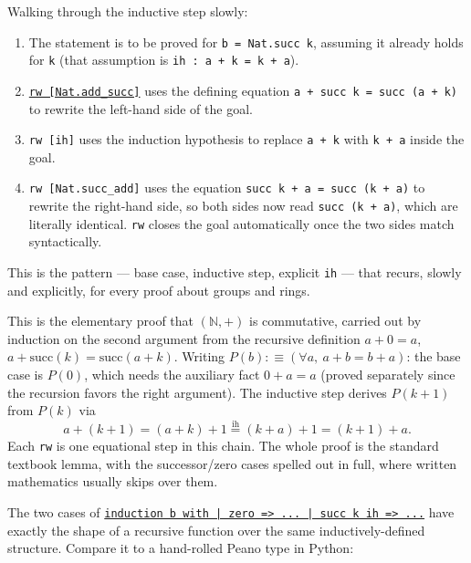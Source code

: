 Walking through the inductive step slowly:

\begin{enumerate}
\def\labelenumi{\arabic{enumi}.}
\tightlist
\item
  The statement is to be proved for \texttt{b = Nat.succ k}, assuming it already holds for \texttt{k} (that assumption is \texttt{ih : a + k = k + a}).
\item
  \href{https://lean-lang.org/doc/reference/latest/Tactic-Proofs/Tactic-Reference/}{\texttt{rw [Nat.add\_\allowbreak{}succ]}} uses the defining equation \texttt{a + succ k = succ (a + k)} to rewrite the left-hand side of the goal.
\item
  \texttt{rw [ih]} uses the induction hypothesis to replace \texttt{a + k} with \texttt{k + a} inside the goal.
\item
  \texttt{rw [Nat.succ\_\allowbreak{}add]} uses the equation \texttt{succ k + a = succ (k + a)} to rewrite the right-hand side, so both sides now read \texttt{succ (k + a)}, which are literally identical. \texttt{rw} closes the goal automatically once the two sides match syntactically.
\end{enumerate}

This is the pattern --- base case, inductive step, explicit \texttt{ih} --- that recurs, slowly and explicitly, for every proof about groups and rings.

\begin{mathreading}

This is the elementary proof that \((\mathbb{N},
+)\) is commutative, carried out by induction on the second argument from the recursive definition \(a + 0 = a\), \(a + \mathrm{succ}(k) = \mathrm{succ}(a +
k)\). Writing \(P(b) :\equiv (\forall a,\ a + b = b + a)\): the base case is \(P(0)\), which needs the auxiliary fact \(0 + a = a\) (proved separately since the recursion favors the right argument). The inductive step derives \(P(k+1)\) from \(P(k)\) via \[
a + (k{+}1) = (a+k){+}1 \overset{\mathrm{ih}}{=} (k+a){+}1 = (k{+}1)+a.
\] Each \texttt{rw} is one equational step in this chain. The whole proof is the standard textbook lemma, with the successor/zero cases spelled out in full, where written mathematics usually skips over them.

\end{mathreading}

\begin{progcorner}

The two cases of \href{https://lean-lang.org/doc/reference/latest/Tactic-Proofs/Tactic-Reference/}{\texttt{induction b with | zero => ... | succ k ih => ...}} have exactly the shape of a recursive function over the same inductively-defined structure. Compare it to a hand-rolled Peano type in Python:

\end{progcorner}

